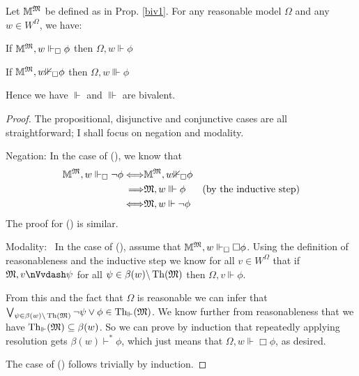 \begin{proposition}
  Let $\mathbbm{M}^{\Omega}$ be defined as in Prop.  \ref{biv1}.
  For any reasonable model $\Omega$ and any $w \in W^{\Omega}$, we have:
  \begin{enumerateroman}
    \item If $\mathbbm{M}^{\Omega}, w \Vdash_{\Box} \phi$ then $\Omega, w
    \Vdash \phi$
    
    \item If $\mathbbm{M}^{\Omega}, w {\nVdash}_{\Box} \phi$ then $\Omega,
    w \Vvdash \phi$
  \end{enumerateroman}  
  Hence we have $\Vdash$ and $\Vvdash$ are bivalent.
\end{proposition}

\begin{proof}
  The propositional, disjunctive and conjunctive cases are all
  straightforward; I shall focus on negation and modality.
  
  Negation: In the case of (), we know that \
  \begin{eqnarray}
    \mathbbm{M}^{\Omega}, w \Vdash_{\Box} \neg \phi \Longleftrightarrow &
    \mathbbm{M}^{\Omega}, w {\nVdash}_{\Box} \phi &  \nonumber\\
    \Longrightarrow & \Omega, w \Vvdash \phi & \text{(by the inductive step)}
    \nonumber\\
    \Longleftrightarrow & \Omega, w \Vdash \neg \phi &  \nonumber
  \end{eqnarray}
  The proof for () is similar.
  
  Modality: \ In the case of (), assume that
  $\mathbbm{M}^{\Omega}, w \Vdash_{\Box} \Box \phi$. Using the definition of
  reasonableness and the inductive step we know for all $v \in W^{\Omega}$
  that if $\Omega, v {\nVvdash} \psi$ for all $\psi \in \beta (w)
  \backslash \tmop{Th} (\Omega)$ then $\Omega, v \Vdash \phi$.
  
  From this and the fact that $\Omega$ is reasonable we can infer that
  $\bigvee_{\psi \in \beta (w) \backslash \tmop{Th} (\Omega)} \neg \psi \vee
  \phi \in \tmop{Th}_{\Vdash} (\Omega)$.   We know further from reasonableness
  that we have $\tmop{Th}_{\Vdash} (\Omega) \subseteq \beta (w)$. So we can
  prove by induction that repeatedly applying resolution gets $\beta (w)
  \vdash^{\ast} \phi$, which just means that $\Omega, w \Vdash \Box \phi$, as
  desired.
  
  The case of () follows trivially by induction.
\end{proof}

